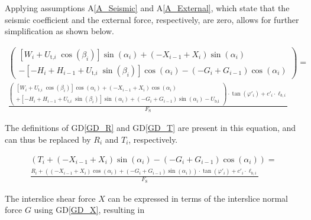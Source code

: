 \documentclass[12pt]{article}
\newcommand{\aref}[1]{A\ref{#1}}
\newcommand{\dref}[1]{GD\ref{#1}}
\begin{document}
\noindent Applying assumptions \aref{A_Seismic} and \aref{A_External}, which 
state that the seismic coefficient and the external force, respectively, are 
zero, allows for further simplification as shown below.

\begin{equation*}
\begin{array}{l} \left( \begin{array}{l} \left[
W_{i} +
{U_{\text{t,}i}}\;{\cos\left(\beta_{i}\right)}
\right]\sin\left(\alpha_{i}\right) + \left(-X_{i-1} + 
X_{i}\right)\sin\left(\alpha_{i}\right)\\ - \left[
{- H_{i} + H_{i-1} +
{U_{\text{t,}i}}\;{\sin\left(\beta_{i}\right)}}
\right]\cos\left(\alpha_{i}\right)
 - \left(- G_{i} + 
G_{i-1}\right)\cos\left(\alpha_{i}\right) \end{array} 
\right) =\\ \frac 
{ 
	\left( \begin{array}{l}
	\left[ W_{i} +
	{U_{\text{t,}i}}\;{\cos\left(\beta_{i}\right)}
	\right]\cos\left(\alpha_{i}\right) + \left(- X_{i-1} 
	+ X_{i}\right)\cos\left(\alpha_{i}\right) \\ + \left[
	{- H_{i} + H_{i-1} +
	{U_{\text{t,}i}}\;{\sin\left(\beta_{i}\right)}}
	\right]\sin\left(\alpha_{i}\right) + \left(- G_{i} + 
	G_{i-1}\right)\sin\left(\alpha_{i}\right) -
	U_{\text{b,i}} \end{array} \right) \cdot \tan\left( 
	\varphi'_{i}
	\right) + c'_i \cdot \ell_{b,i} }{F_\text{S}} \end{array}
\end{equation*}

\noindent The definitions of \dref{GD_R} and \dref{GD_T} are present in this 
equation, and can thus be replaced by $R_i$ and $T_i$, respectively.

\begin{equation*}
\begin{array}{l} \left( T_{i} + \left(-X_{i-1} + 
X_{i}\right)\sin\left(\alpha_{i}\right)
- \left(- G_{i} + 
G_{i-1}\right)\cos\left(\alpha_{i}\right)
\right) =\\ \frac 
{ 
	R_{i} + \left(\left(- X_{i-1} 
	+ X_{i}\right)\cos\left(\alpha_{i}\right) + \left(- 
	G_{i} + 
	G_{i-1}\right)\sin\left(\alpha_{i}\right) \right) \cdot 
	\tan\left( 
	\varphi'_{i}
	\right) + c'_i \cdot \ell_{b,i} }{F_\text{S}} \end{array}
\end{equation*}

\noindent The interslice shear force $X$ can be expressed in terms of the 
interslice normal force $G$ using \dref{GD_X}, resulting in
\end{document}
